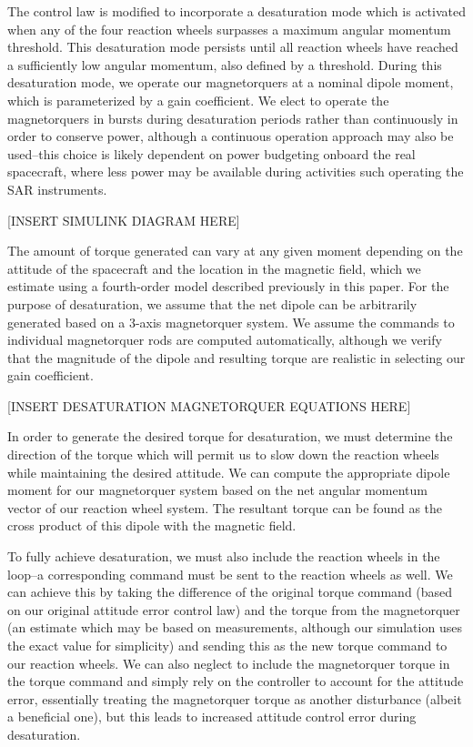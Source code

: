The control law is modified to incorporate a desaturation mode which is activated when any of the four reaction wheels surpasses a maximum angular momentum threshold. This desaturation mode persists until all reaction wheels have reached a sufficiently low angular momentum, also defined by a threshold. During this desaturation mode, we operate our magnetorquers at a nominal dipole moment, which is parameterized by a gain coefficient. We elect to operate the magnetorquers in bursts during desaturation periods rather than continuously in order to conserve power, although a continuous operation approach may also be used–this choice is likely dependent on power budgeting onboard the real spacecraft, where less power may be available during activities such operating the SAR instruments.

[INSERT SIMULINK DIAGRAM HERE]

The amount of torque generated can vary at any given moment depending on the attitude of the spacecraft and the location in the magnetic field, which we estimate using a fourth-order model described previously in this paper. For the purpose of desaturation, we assume that the net dipole can be arbitrarily generated based on a 3-axis magnetorquer system.  We assume the commands to individual magnetorquer rods are computed automatically, although we verify that the magnitude of the dipole and resulting torque are realistic in selecting our gain coefficient.

[INSERT DESATURATION MAGNETORQUER EQUATIONS HERE]

In order to generate the desired torque for desaturation, we must determine the direction of the torque which will permit us to slow down the reaction wheels while maintaining the desired attitude. We can compute the appropriate dipole moment for our magnetorquer system based on the net angular momentum vector of our reaction wheel system. The resultant torque can be found as the cross product of this dipole with the magnetic field.

To fully achieve desaturation, we must also include the reaction wheels in the loop–a corresponding command must be sent to the reaction wheels as well. We can achieve this by taking the difference of the original torque command (based on our original attitude error control law) and the torque from the magnetorquer (an estimate which may be based on measurements, although our simulation uses the exact value for simplicity) and sending this as the new torque command to our reaction wheels. We can also neglect to include the magnetorquer torque in the torque command and simply rely on the controller to account for the attitude error, essentially treating the magnetorquer torque as another disturbance (albeit a beneficial one), but this leads to increased attitude control error during desaturation.

